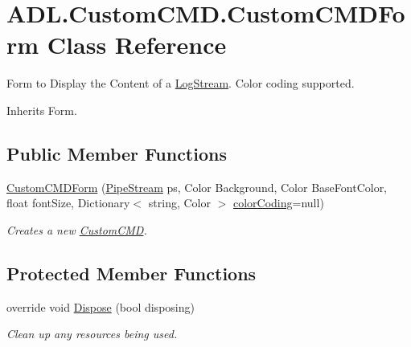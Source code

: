 \hypertarget{class_a_d_l_1_1_custom_c_m_d_1_1_custom_c_m_d_form}{}\section{A\+D\+L.\+Custom\+C\+M\+D.\+Custom\+C\+M\+D\+Form Class Reference}
\label{class_a_d_l_1_1_custom_c_m_d_1_1_custom_c_m_d_form}


Form to Display the Content of a \mbox{\hyperlink{class_a_d_l_1_1_log_stream}{Log\+Stream}}. Color coding supported.  




Inherits Form.

\subsection*{Public Member Functions}
\begin{DoxyCompactItemize}
\item 
\mbox{\hyperlink{class_a_d_l_1_1_custom_c_m_d_1_1_custom_c_m_d_form_a949c39b280cf0d3fe4490c8731078bad}{Custom\+C\+M\+D\+Form}} (\mbox{\hyperlink{class_a_d_l_1_1_pipe_stream}{Pipe\+Stream}} ps, Color Background, Color Base\+Font\+Color, float font\+Size, Dictionary$<$ string, Color $>$ \mbox{\hyperlink{class_a_d_l_1_1_custom_c_m_d_1_1_custom_c_m_d_form_a705b940da9cebdc776afa008f2fe9bd7}{color\+Coding}}=null)
\begin{DoxyCompactList}\small\item\em Creates a new \mbox{\hyperlink{namespace_a_d_l_1_1_custom_c_m_d}{Custom\+C\+MD}}. \end{DoxyCompactList}\end{DoxyCompactItemize}
\subsection*{Protected Member Functions}
\begin{DoxyCompactItemize}
\item 
override void \mbox{\hyperlink{class_a_d_l_1_1_custom_c_m_d_1_1_custom_c_m_d_form_a17d8b37ecf0237238b3f2f988a4ec700}{Dispose}} (bool disposing)
\begin{DoxyCompactList}\small\item\em Clean up any resources being used. \end{DoxyCompactList}\end{DoxyCompactItemize}

